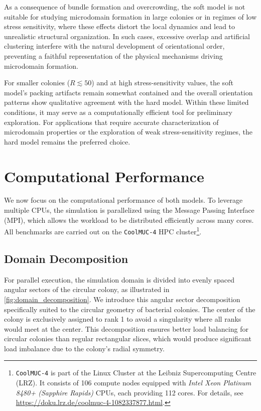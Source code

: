\documentclass[a4paper,fleqn]{cas-dc}
\begin{document}
As a consequence of bundle formation and overcrowding, the soft model is not suitable for studying microdomain formation in large colonies or in regimes of low stress sensitivity, where these effects distort the local dynamics and lead to unrealistic structural organization. In such cases, excessive overlap and artificial clustering interfere with the natural development of orientational order, preventing a faithful representation of the physical mechanisms driving microdomain formation.

For smaller colonies ($R \lesssim 50$) and at high stress-sensitivity values, the
soft model's packing artifacts remain somewhat contained and
the overall orientation patterns show qualitative agreement with the hard model.
Within these limited conditions, it may serve as a computationally efficient tool
for preliminary exploration. For applications that require accurate characterization of microdomain properties or the exploration of weak stress-sensitivity regimes, the hard model remains the preferred choice.



\section{Computational Performance}
\label{sec:performance_analysis}

We now focus on the computational performance of both models. To leverage multiple CPUs, the simulation is parallelized using the Message Passing Interface (MPI), which allows the workload to be distributed efficiently across many cores. All benchmarks are carried out on the \texttt{CoolMUC-4} HPC cluster\footnote{\texttt{CoolMUC-4} is part of the Linux Cluster at the Leibniz Supercomputing Centre (LRZ). It consists of 106 compute nodes equipped with \textit{Intel Xeon Platinum 8480+ (Sapphire Rapids)} CPUs, each providing 112 cores. For details, see \url{https://doku.lrz.de/coolmuc-4-1082337877.html}.}.

\subsection{Domain Decomposition}

For parallel execution, the simulation domain is divided into evenly spaced angular sectors of the circular colony, as illustrated in \autoref{fig:domain_decomposition}. We introduce this angular sector decomposition specifically suited to the circular geometry of bacterial colonies. The center of the colony is exclusively assigned to rank 1 to avoid a singularity where all ranks would meet at the center. This decomposition ensures better load balancing for circular colonies than regular rectangular slices, which would produce significant load imbalance due to the colony's radial symmetry.
\end{document}
